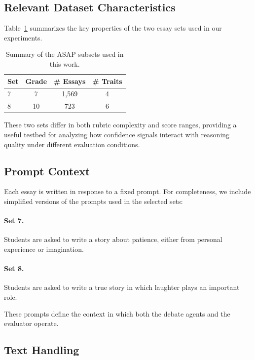 \documentclass[11pt]{article}
\begin{document}
\subsection{Relevant Dataset Characteristics}

Table~\ref{tab:asap_subset} summarizes the key properties of the two essay sets used in our experiments.

\begin{table}[h]
\centering
\small
\caption{Summary of the ASAP subsets used in this work.}
\label{tab:asap_subset}
\begin{tabular}{lccc}
\toprule
\textbf{Set} & \textbf{Grade} & \textbf{\# Essays} & \textbf{\# Traits} \\
\midrule
7 & 7  & 1,569 & 4 \\
8 & 10 & 723   & 6 \\
\bottomrule
\end{tabular}
\end{table}

These two sets differ in both rubric complexity and score ranges, providing a useful testbed for analyzing how confidence signals interact with reasoning quality under different evaluation conditions.

\subsection{Prompt Context}

Each essay is written in response to a fixed prompt. For completeness, we include simplified versions of the prompts used in the selected sets:

\paragraph{Set 7.}
Students are asked to write a story about patience, either from personal experience or imagination.

\paragraph{Set 8.}
Students are asked to write a true story in which laughter plays an important role.

These prompts define the context in which both the debate agents and the evaluator operate.

\subsection{Text Handling}
\end{document}
